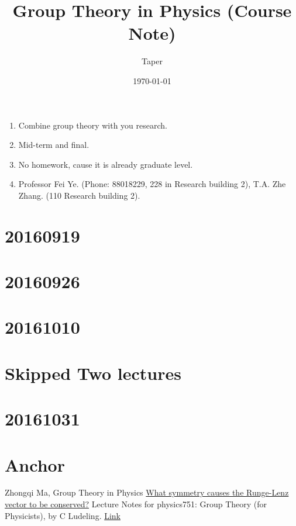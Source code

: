 \documentclass{article}
\title{Group Theory in Physics (Course Note)}
\date{\today}
\author{Taper}
\begin{document}
\maketitle
{}
\tableofcontents
\begin{enumerate}
    \item Combine group theory with you research.
    \item Mid-term and final.
    \item No homework, cause it is already graduate level.
    \item Professor Fei Ye. (Phone: 88018229, 228 in Research building 2), 
        T.A. Zhe Zhang. (110 Research building 2).
\end{enumerate}

\section{20160919}
\label{sec:20160919}


\section{20160926}
\label{sec:20160926}


\section{20161010}
\label{sec:20161010}


\section{Skipped Two lectures}


\section{20161031}
\label{sec:20161031}

\section{Anchor}
\label{sec:Anchor}
\begin{thebibliography}{1}
     Zhongqi Ma, Group Theory in Physics
     \href{physics.stackexchange.com/questions/18088/what-symmetry-causes-the-runge-lenz-vector-to-be-conserved}{What symmetry causes the Runge-Lenz vector to be conserved?}
     Lecture Notes for physics751: Group Theory (for
    Physicists), by C Ludeling.
    \href{http://www.th.physik.uni-bonn.de/nilles/people/luedeling/grouptheory/data/grouptheorynotes.pdf}{Link}
\end{thebibliography}
\printnomenclature
\end{document}
